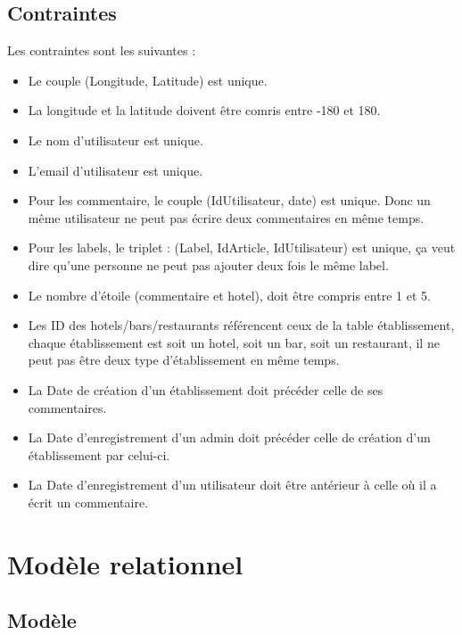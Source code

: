 \documentclass[a4paper,10pt]{article}
\begin{document}
\subsection{Contraintes}
Les contraintes sont les suivantes :
\begin{itemize}
  \item Le couple (Longitude, Latitude) est unique.
  \item La longitude et la latitude doivent être comris entre -180 et 180.
  \item Le nom d'utilisateur est unique.
  \item L'email d'utilisateur est unique.
  \item Pour les commentaire, le couple (IdUtilisateur, date) est unique. Donc
      un même utilisateur ne peut pas écrire deux commentaires en même temps.
  \item Pour les labels, le triplet : (Label, IdArticle, IdUtilisateur) est
      unique, ça veut dire qu'une personne ne peut pas ajouter deux fois le
      même label.
  \item Le nombre d'étoile (commentaire et hotel), doit être compris entre 1 et 5.
  \item Les ID des hotels/bars/restaurants référencent ceux de la table
      établissement, chaque établissement est soit un hotel, soit un bar, soit
      un restaurant, il ne peut pas être deux type d'établissement en même
      temps.
  \item La Date de création d'un établissement doit précéder celle de ses commentaires.
  \item La Date d'enregistrement d'un admin doit précéder celle de création d'un établissement par celui-ci.
  \item La Date d'enregistrement d'un utilisateur doit être antérieur à celle où il a écrit un commentaire.
\end{itemize}



\section{Modèle relationnel}
\subsection{Modèle}
\end{document}
